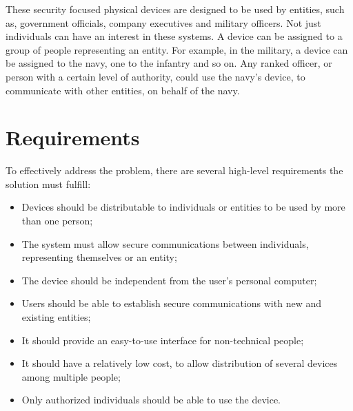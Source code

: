 These security focused physical devices are designed to be used by entities, such as, government officials, company executives and military officers.
Not just individuals can have an interest in these systems. A device can be assigned to a group of people representing an entity. For example, in the military, a device can be assigned to the navy, one to the infantry and so on. Any ranked officer, or person with a certain level of authority, could use the navy's device, to communicate with other entities, on behalf of the navy.

%

\section{Requirements}\label{chap:problem:requirements}

To effectively address the problem, there are several high-level requirements the solution must fulfill:
\begin{itemize}
	\item Devices should be distributable to individuals or entities to be used by more than one person;
	\item The system must allow secure communications between individuals, representing themselves or an entity;
	\item The device should be independent from the user's personal computer;
	\item Users should be able to establish secure communications with new and existing entities;
	\item It should provide an easy-to-use interface for non-technical people;
	\item It should have a relatively low cost, to allow distribution of several devices among multiple people;
	\item Only authorized individuals should be able to use the device.
\end{itemize}

